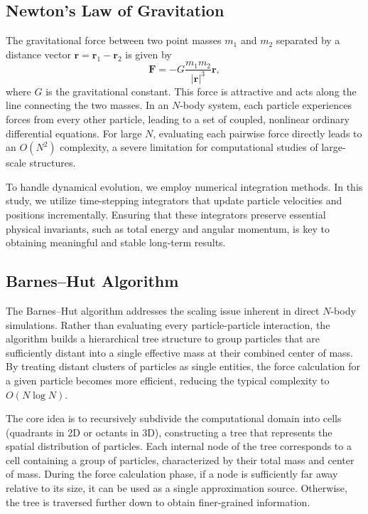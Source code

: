 \documentclass[a4paper, 12pt, oneside, onecolumn]{article}
\begin{document}
\begin{multicols}{2}
\subsection{Newton’s Law of Gravitation}

The gravitational force between two point masses $m_1$ and $m_2$ separated by a distance vector $\mathbf{r} = \mathbf{r}_1 - \mathbf{r}_2$ is given by
\begin{equation}
\mathbf{F} = -G \frac{m_1 m_2}{|\mathbf{r}|^3} \mathbf{r},
\end{equation}
where $G$ is the gravitational constant. This force is attractive and acts along the line connecting the two masses. In an $N$-body system, each particle experiences forces from every other particle, leading to a set of coupled, nonlinear ordinary differential equations. For large $N$, evaluating each pairwise force directly leads to an $O(N^2)$ complexity, a severe limitation for computational studies of large-scale structures.

To handle dynamical evolution, we employ numerical integration methods. In this study, we utilize time-stepping integrators that update particle velocities and positions incrementally. Ensuring that these integrators preserve essential physical invariants, such as total energy and angular momentum, is key to obtaining meaningful and stable long-term results.

\subsection{Barnes–Hut Algorithm\cite{barnes_hierarchical_1986}}

The Barnes–Hut algorithm addresses the scaling issue inherent in direct $N$-body simulations. Rather than evaluating every particle-particle interaction, the algorithm builds a hierarchical tree structure to group particles that are sufficiently distant into a single effective mass at their combined center of mass. By treating distant clusters of particles as single entities, the force calculation for a given particle becomes more efficient, reducing the typical complexity to $O(N \log N)$.

The core idea is to recursively subdivide the computational domain into cells (quadrants in 2D or octants in 3D), constructing a tree that represents the spatial distribution of particles. Each internal node of the tree corresponds to a cell containing a group of particles, characterized by their total mass and center of mass. During the force calculation phase, if a node is sufficiently far away relative to its size, it can be used as a single approximation source. Otherwise, the tree is traversed further down to obtain finer-grained information.


\end{multicols}
\end{document}
